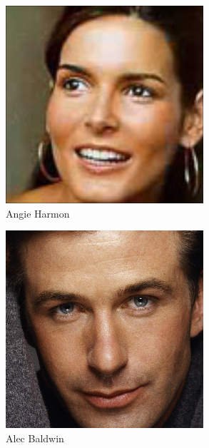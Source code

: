 \documentclass{article}
\begin{document}
\begin{figure}
\begin{subfigure}{0.5\linewidth}
		\includegraphics[width=0.75\linewidth]{most_harmon}
		\caption{Angie Harmon}
	\end{subfigure}%
	\begin{subfigure}{0.5\linewidth}
		\centering
		\includegraphics[width=0.75\linewidth]{most_baldwin}
		\caption{Alec Baldwin}
	\end{subfigure}\vspace{1em}
	\begin{subfigure}{0.5\linewidth}
		\centering

\end{subfigure}
\end{figure}
\end{document}
